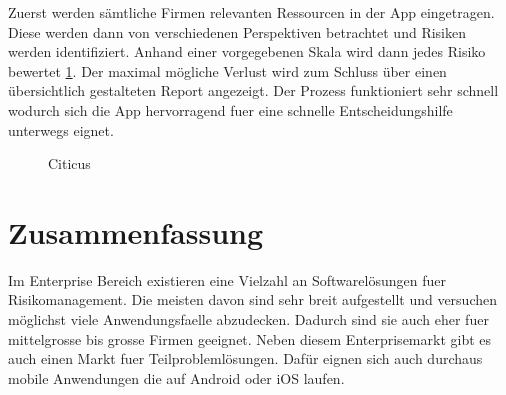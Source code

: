 Zuerst werden sämtliche Firmen relevanten Ressourcen in der App eingetragen. Diese werden dann von verschiedenen Perspektiven betrachtet und Risiken werden identifiziert. Anhand einer vorgegebenen Skala wird dann jedes Risiko bewertet \ref{fig:citicus}. Der maximal mögliche Verlust wird zum Schluss über einen übersichtlich gestalteten Report angezeigt. Der Prozess funktioniert sehr schnell wodurch sich die App hervorragend fuer eine schnelle Entscheidungshilfe unterwegs eignet.\cite{Citicus}

\begin{figure}[h!]
  \centering
  \caption{Citicus}
  \label{fig:citicus}
\end{figure}

\section{Zusammenfassung}

Im Enterprise Bereich existieren eine Vielzahl an Softwarelösungen fuer Risikomanagement. Die meisten davon sind sehr breit aufgestellt und versuchen möglichst viele Anwendungsfaelle abzudecken. Dadurch sind sie auch eher fuer mittelgrosse bis grosse Firmen geeignet.
Neben diesem Enterprisemarkt gibt es auch einen Markt fuer Teilproblemlösungen. Dafür eignen sich auch durchaus mobile Anwendungen die auf Android oder iOS laufen.














